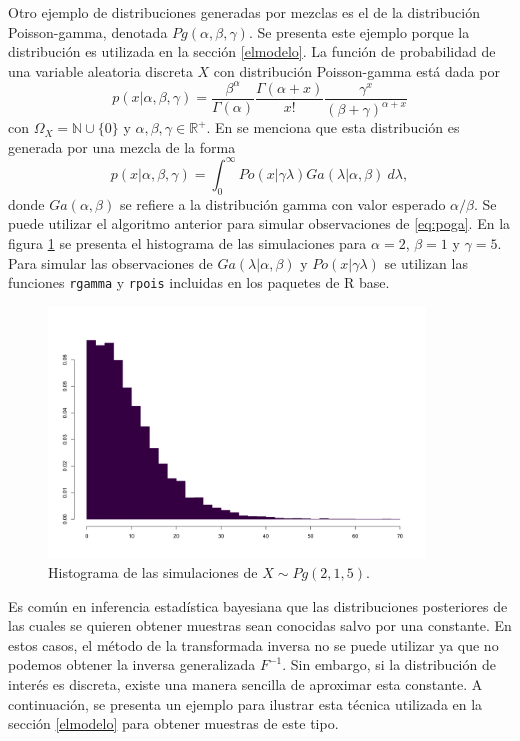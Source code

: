 \documentclass[11pt,a4paper]{article}
\begin{document}
Otro ejemplo de distribuciones generadas por mezclas es el de la distribución Poisson-gamma, denotada $Pg(\alpha, \beta, \gamma)$. Se presenta este ejemplo porque la distribución es utilizada en la sección \ref{elmodelo}. La función de probabilidad de una variable aleatoria discreta $X$ con distribución Poisson-gamma está dada por
\begin{equation}
\label{eq:poga}
p(x | \alpha, \beta, \gamma) = \frac{\beta ^ \alpha}{\Gamma (\alpha)}\frac{\Gamma (\alpha + x)}{x!}\frac{\gamma ^ x}{(\beta + \gamma) ^ {\alpha + x}}
\end{equation}
con $\Omega_X = \mathbb{N} \cup \lbrace 0 \rbrace$ y $\alpha, \beta, \gamma \in \mathbb{R}^+$. En \citet{bernardo} se menciona que esta distribución es generada por una mezcla de la forma
$$p(x | \alpha, \beta, \gamma) = \int_0 ^\infty Po(x | \gamma \lambda) Ga(\lambda | \alpha, \beta) \ d\lambda,$$ donde $Ga(\alpha, \beta)$ se refiere a la distribución gamma con valor esperado $\alpha / \beta$. Se puede utilizar el algoritmo anterior para simular observaciones de \eqref{eq:poga}. En la figura \ref{fig:poga} se presenta el histograma de las simulaciones para $\alpha = 2$, $\beta = 1$ y $\gamma = 5$. Para simular las observaciones de $Ga(\lambda | \alpha, \beta)$ y $Po(x | \gamma \lambda)$ se utilizan las funciones \texttt{rgamma} y \texttt{rpois} incluidas en los paquetes de R base.

\begin{figure}[htb]
\centering\includegraphics[width=10cm]{poisson_gamma.png}
\caption{Histograma de las simulaciones de $X \sim Pg(2, 1, 5)$.}
\label{fig:poga}
\end{figure}

\newpage

Es común en inferencia estadística bayesiana que las distribuciones posteriores de las cuales se quieren obtener muestras sean conocidas salvo por una constante. En estos casos, el método de la transformada inversa no se puede utilizar ya que no podemos obtener la inversa generalizada $F^{-1}$. Sin embargo, si la distribución de interés es discreta, existe una manera sencilla de aproximar esta constante. A continuación, se presenta un ejemplo para ilustrar esta técnica utilizada en la sección \ref{elmodelo} para obtener muestras de este tipo.
\end{document}
